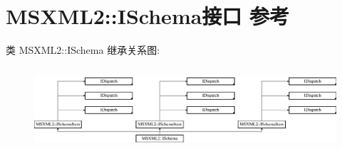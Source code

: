 \hypertarget{interface_m_s_x_m_l2_1_1_i_schema}{}\section{M\+S\+X\+M\+L2\+:\+:I\+Schema接口 参考}
\label{interface_m_s_x_m_l2_1_1_i_schema}
类 M\+S\+X\+M\+L2\+:\+:I\+Schema 继承关系图\+:\begin{figure}[H]
\begin{center}
\leavevmode
\includegraphics[height=3.131991cm]{interface_m_s_x_m_l2_1_1_i_schema}
\end{center}
\end{figure}
